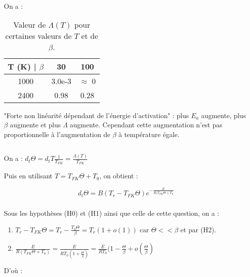 \documentclass[10pt,a4paper,twocolumn]{report}
\begin{document}
On a : 

\begin{table}[H]
	\begin{center}
	\begin{tabular}{|c|c|c|}
 		\hline
 		T (K) | $\beta$ & 30 & 100 \\ 
 		\hline
 		1000 & 3.0e-3 & $\approx$ 0 \\ 
 		\hline
 		2400 & 0.98 & 0.28  \\
 		\hline
	\end{tabular}
	\end{center}
 \caption{Valeur de $\Lambda(T)$ pour certaines valeurs de $T$ et de $\beta$.}
\end{table}


"Forte non linéarité dépendant de l'énergie d'activation" : plus $E_a$ augmente, plus $\beta$ augmente et plus $\Lambda$ augmente.
Cependant cette augmentation n'est pas proportionnelle à  l'augmentation de $\beta$ à température égale.

\subsection{} %
\subsubsection{} %

On a : $ d_t\Theta = d_tT \frac{1}{T_{FK}}  = \frac{\Lambda(T)}{T_{FK}}$

Puis en utilisant $ T = T_{FK} \Theta + T_0 $, on obtient :

	$$ d_t\Theta = B(T_r - T_{FK} \Theta)e^{-\frac{E}{R(T_{FK}\Theta+T_0}} $$
	
\subsubsection{} %

Sous les hypothèses (H0) et (H1) ainsi que celle de cette question, on a :
\begin{enumerate}
	\item $T_r - T_{FK} \Theta = T_r - \frac{T_0\Theta}{\beta} = T_r(1 + o(1))$ car $\Theta << \beta$ et par (H2).
	\item $\frac{E}{R(T_{FK}\Theta+T_0)} = \frac{E}{RT_0(1+\frac{\Theta}{\beta})} = \frac{E}{RT_0} (1-\frac{\Theta}{\beta} + o(\frac{\Theta}{\beta}) $ 
\end{enumerate} 

D'où : 
\end{document}
